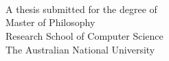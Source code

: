 
\begin{titlepage}
  \enlargethispage{2cm}
  \begin{center}
    \makeatletter
    \Huge\textbf{\@title} \\[.4cm]
    \Huge\textbf{\thesisqualifier} \\[2.5cm]
    \huge\textbf{\@author} \\[9cm]
    \makeatother
    \LARGE A thesis submitted for the degree of \\
    Master of Philosophy\\
    Research School of Computer Science\\
    The Australian National University \\[2cm]
    \thismonth
  \end{center}
\end{titlepage}
